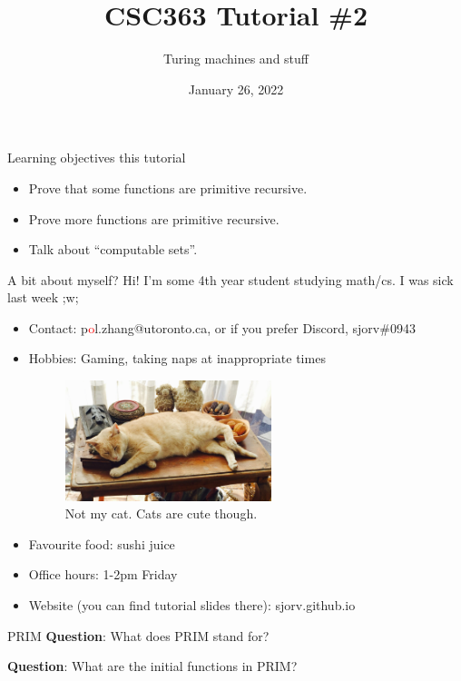 \documentclass{beamer}
\title{CSC363 Tutorial \#2}
\subtitle{Turing machines and stuff}
\date{January 26, 2022}
\institute{}
\begin{document}
\maketitle

\begin{frame}{Learning objectives this tutorial}
\begin{itemize}
\item Prove that some functions are primitive recursive.
\item Prove more functions are primitive recursive.
\item Talk about ``computable sets''.
\end{itemize}
\end{frame}

\begin{frame}{A bit about myself?}
Hi! I'm some 4th year student studying math/cs. I was sick last week ;w;
\begin{itemize}
    \item Contact: p\textcolor{red}{o}l.zhang@utoronto.ca, or if you prefer Discord, sjorv\#0943
    \item Hobbies: Gaming, taking naps at inappropriate times
    \begin{figure}
        \centering
        \includegraphics[width=6cm]{img/siesta.jpg}
        \caption*{Not my cat. Cats are cute though.}
    \end{figure}
    \item Favourite food: sushi juice
    \item Office hours: 1-2pm Friday
    \item Website (you can find tutorial slides there): sjorv.github.io
\end{itemize}
\end{frame}

\begin{frame}{PRIM}
\textbf{Question}: What does PRIM stand for?

\pause

\textbf{Question}: What are the initial functions in PRIM?
\end{frame}
\end{document}
